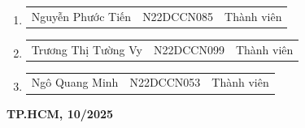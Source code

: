 \documentclass[DoAn.tex]{subfiles}
\begin{document}
\begin{titlepage}
\begin{center}
		\vspace{-0.3cm}
		\begin{minipage}{0.9\textwidth}
			\begin{enumerate}
				\item
				      \begin{tabular}{@{}p{4cm} p{3cm} p{3cm}@{}}
					      Nguyễn Phước Tiến & N22DCCN085 & Thành viên \\
				      \end{tabular}
				\item
				      \begin{tabular}{@{}p{4cm} p{3cm} p{3cm}@{}}
					      Trương Thị Tường Vy & N22DCCN099 & Thành viên \\
				      \end{tabular}
				\item
				      \begin{tabular}{@{}p{4cm} p{3cm} p{3cm}@{}}
					      Ngô Quang Minh & N22DCCN053 & Thành viên \\
				      \end{tabular}
			\end{enumerate}
		\end{minipage}

		\vspace{2cm}
		\textbf{TP.HCM, 10/2025}
	\end{center}

\end{titlepage}
\end{document}
